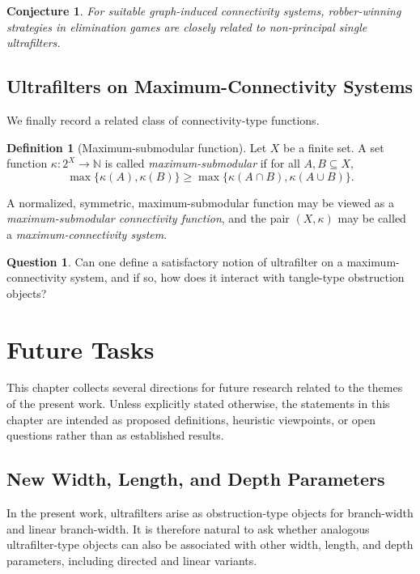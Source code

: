 \documentclass[10pt]{book}
\newtheorem{conjecture}[theorem]{Conjecture}
\theoremstyle{definition}
\newtheorem{definition}[theorem]{Definition}
\newtheorem{question}[theorem]{Question}
\begin{document}
\begin{conjecture}
For suitable graph-induced connectivity systems, robber-winning strategies in elimination games are closely related to non-principal single ultrafilters.
\end{conjecture}

\section{Ultrafilters on Maximum-Connectivity Systems}
We finally record a related class of connectivity-type functions.

\begin{definition}[Maximum-submodular function]
\label{def:maximum_submodular}
Let \(X\) be a finite set.
A set function \(\kappa:2^X\to \mathbb{N}\) is called \emph{maximum-submodular} if for all \(A,B\subseteq X\),
\[
\max\{\kappa(A),\kappa(B)\}
\geq
\max\{\kappa(A\cap B),\kappa(A\cup B)\}.
\]
\end{definition}

A normalized, symmetric, maximum-submodular function may be viewed as a \emph{maximum-submodular connectivity function}, and the pair \((X,\kappa)\) may be called a \emph{maximum-connectivity system}.

\begin{question}
Can one define a satisfactory notion of ultrafilter on a maximum-connectivity system, and if so, how does it interact with tangle-type obstruction objects?
\end{question}
\chapter{Future Tasks}

This chapter collects several directions for future research related to the themes of the present work.
Unless explicitly stated otherwise, the statements in this chapter are intended as proposed definitions, heuristic viewpoints, or open questions rather than as established results.

\section{New Width, Length, and Depth Parameters}

In the present work, ultrafilters arise as obstruction-type objects for branch-width and linear branch-width.
It is therefore natural to ask whether analogous ultrafilter-type objects can also be associated with other width, length, and depth parameters, including directed and linear variants.
\end{document}
